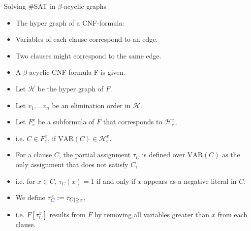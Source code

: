 \begin{frame}[t]{Solving \#SAT in $\beta$-acyclic graphs}
	\begin{itemize}[<+->]
	\item The hyper graph of a CNF-formula:
	\item[]\hspace{1cm}Variables of each clause correspond to an edge.
	\item[]\hspace{1cm}Two clauses might correspond to the same edge.
	\item A $\beta$-acyclic CNF-formula F is given.
	\item Let $\mathcal{H}$ be the hyper graph of $F$.
	\item Let $v_1, \dots v_n$ be an elimination order in $\mathcal{H}$.
	\item Let {\color{blue}$F^x_e$} be a subformula of $F$ that corresponds to $\mathcal{H}^x_e$,
	\item[]\hspace{1cm}i.e. $C \in F^x_e$, if $\mathrm{VAR}(C) \in \mathcal{H}^x_e$.
	\item For a clause $C$, the partial assignment {\color{blue}$\tau_C$} is defined over $\mathrm{VAR}(C)$ as the only assignment that does not satisfy $C$,
	\item[]\hspace{1cm}i.e. for $x \in C$, $\tau_C(x) = 1$ if and only if $x$ appears as a negative literal in $C$.
	\item We define ${\color{blue}\tau^x_C} := \tau_{C|\geq x}$,
	\item[]\hspace{1cm}i.e. $F[\tau^x_C]$ results from $F$ by removing all variables greater than $x$ from each clause.
	\end{itemize}
\end{frame}
